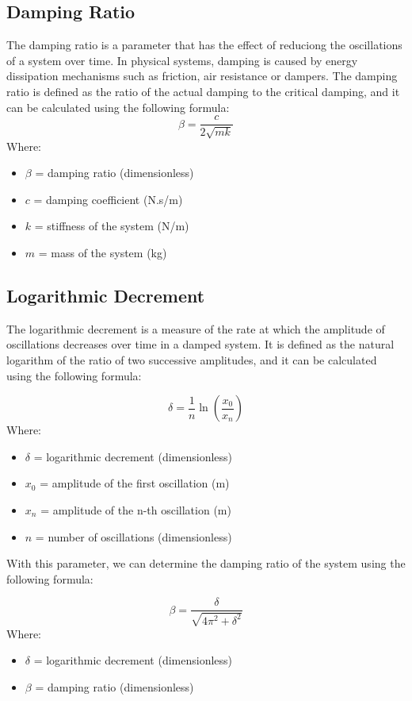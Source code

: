 \documentclass{article}  %
\begin{document}
\subsection{Damping Ratio}
The damping ratio is a parameter that has the effect of reduciong the oscillations of a system over time. In physical systems, damping is caused by energy dissipation mechanisms such as friction, air resistance or dampers. The damping ratio is defined as the ratio of the actual damping to the critical damping, and it can be calculated using the following formula:
\begin{equation}
\beta = \frac{c}{2\sqrt{mk}}
\end{equation}
Where:
\begin{itemize}
  \item $\beta$ = damping ratio (dimensionless)
  \item $c$ = damping coefficient (N.s/m)
  \item $k$ = stiffness of the system (N/m)
  \item $m$ = mass of the system (kg)
\end{itemize}

\subsection{Logarithmic Decrement}
The logarithmic decrement is a measure of the rate at which the amplitude of oscillations decreases over time in a damped system. It is defined as the natural logarithm of the ratio of two successive amplitudes, and it can be calculated using the following formula:

\begin{equation}
\delta = \frac{1}{n} \ln \left( \frac{x_0}{x_n} \right)
\end{equation}
Where:
\begin{itemize}
  \item $\delta$ = logarithmic decrement (dimensionless)
  \item $x_0$ = amplitude of the first oscillation (m)
  \item $x_n$ = amplitude of the n-th oscillation (m)
  \item $n$ = number of oscillations (dimensionless)
\end{itemize}

With this parameter, we can determine the damping ratio of the system using the following formula:

\begin{equation}
\beta = \frac{\delta}{\sqrt{4\pi^2 + \delta^2}}
\end{equation}
Where:
\begin{itemize}
  \item $\delta$ = logarithmic decrement (dimensionless)
  \item $\beta$ = damping ratio (dimensionless)
\end{itemize}
\end{document}
